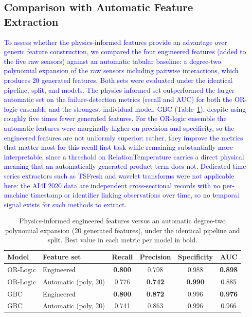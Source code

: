 \subsection{Comparison with Automatic Feature Extraction}
\textcolor{blue}{To assess whether the physics-informed features provide an advantage over generic feature construction, we compared the four engineered features (added to the five raw sensors) against an automatic tabular baseline: a degree-two polynomial expansion of the raw sensors including pairwise interactions, which produces 20 generated features. Both sets were evaluated under the identical pipeline, split, and models. The physics-informed set outperformed the larger automatic set on the failure-detection metrics (recall and AUC) for both the OR-logic ensemble and the strongest individual model, GBC (Table~\ref{tab:autofeat}), despite using roughly five times fewer generated features. For the OR-logic ensemble the automatic features were marginally higher on precision and specificity, so the engineered features are not uniformly superior; rather, they improve the metrics that matter most for this recall-first task while remaining substantially more interpretable, since a threshold on RelationTemperature carries a direct physical meaning that an automatically generated product term does not. Dedicated time-series extractors such as TSFresh and wavelet transforms were not applicable here: the AI4I 2020 data are independent cross-sectional records with no per-machine timestamp or identifier linking observations over time, so no temporal signal exists for such methods to extract.}

\begin{table}[htbp]
\centering
\caption{Physics-informed engineered features versus an automatic degree-two polynomial expansion (20 generated features), under the identical pipeline and split. Best value in each metric per model in bold.}
\label{tab:autofeat}
\begin{tabular}{llcccc}
\hline
Model & Feature set & Recall & Precision & Specificity & AUC \\
\hline
OR-Logic & Engineered & \textbf{0.800} & 0.708 & 0.988 & \textbf{0.898} \\
OR-Logic & Automatic (poly, 20) & 0.776 & \textbf{0.742} & \textbf{0.990} & 0.885 \\
GBC & Engineered & \textbf{0.800} & \textbf{0.872} & 0.996 & \textbf{0.976} \\
GBC & Automatic (poly, 20) & 0.741 & 0.863 & 0.996 & 0.966 \\
\hline
\end{tabular}
\end{table}

